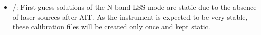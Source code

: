 \begin{itemize}
    \item \hyperref[dataitem:n_lss_dist_sol]{}/\hyperref[dataitem:n_lss_wave_guess]{}: First guess solutions of the N-band LSS mode are static due to the absence of laser sources after \ac{AIT}. As the instrument is expected to be very stable, these calibration files will be created only once and kept static.
\end{itemize}
